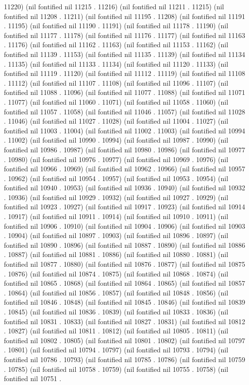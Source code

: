 11220) (nil fontified nil 11215 . 11216) (nil fontified nil 11211 . 11215) (nil fontified nil 11208 . 11211) (nil fontified nil 11195 . 11208) (nil fontified nil 11191 . 11195) (nil fontified nil 11190 . 11191) (nil fontified nil 11178 . 11190) (nil fontified nil 11177 . 11178) (nil fontified nil 11176 . 11177) (nil fontified nil 11163 . 11176) (nil fontified nil 11162 . 11163) (nil fontified nil 11153 . 11162) (nil fontified nil 11139 . 11153) (nil fontified nil 11135 . 11139) (nil fontified nil 11134 . 11135) (nil fontified nil 11133 . 11134) (nil fontified nil 11120 . 11133) (nil fontified nil 11119 . 11120) (nil fontified nil 11112 . 11119) (nil fontified nil 11108 . 11112) (nil fontified nil 11107 . 11108) (nil fontified nil 11096 . 11107) (nil fontified nil 11088 . 11096) (nil fontified nil 11077 . 11088) (nil fontified nil 11071 . 11077) (nil fontified nil 11060 . 11071) (nil fontified nil 11058 . 11060) (nil fontified nil 11057 . 11058) (nil fontified nil 11046 . 11057) (nil fontified nil 11028 . 11046) (nil fontified nil 11027 . 11028) (nil fontified nil 11004 . 11027) (nil fontified nil 11003 . 11004) (nil fontified nil 11002 . 11003) (nil fontified nil 10994 . 11002) (nil fontified nil 10990 . 10994) (nil fontified nil 10987 . 10990) (nil fontified nil 10986 . 10987) (nil fontified nil 10980 . 10986) (nil fontified nil 10977 . 10980) (nil fontified nil 10976 . 10977) (nil fontified nil 10969 . 10976) (nil fontified nil 10966 . 10969) (nil fontified nil 10962 . 10966) (nil fontified nil 10957 . 10962) (nil fontified nil 10954 . 10957) (nil fontified nil 10953 . 10954) (nil fontified nil 10940 . 10953) (nil fontified nil 10936 . 10940) (nil fontified nil 10932 . 10936) (nil fontified nil 10929 . 10932) (nil fontified nil 10927 . 10929) (nil fontified nil 10923 . 10927) (nil fontified nil 10917 . 10923) (nil fontified nil 10914 . 10917) (nil fontified nil 10911 . 10914) (nil fontified nil 10910 . 10911) (nil fontified nil 10906 . 10910) (nil fontified nil 10904 . 10906) (nil fontified nil 10903 . 10904) (nil fontified nil 10897 . 10903) (nil fontified nil 10896 . 10897) (nil fontified nil 10890 . 10896) (nil fontified nil 10887 . 10890) (nil fontified nil 10886 . 10887) (nil fontified nil 10881 . 10886) (nil fontified nil 10880 . 10881) (nil fontified nil 10877 . 10880) (nil fontified nil 10876 . 10877) (nil fontified nil 10875 . 10876) (nil fontified nil 10874 . 10875) (nil fontified nil 10868 . 10874) (nil fontified nil 10865 . 10868) (nil fontified nil 10864 . 10865) (nil fontified nil 10857 . 10864) (nil fontified nil 10856 . 10857) (nil fontified nil 10848 . 10856) (nil fontified nil 10846 . 10848) (nil fontified nil 10845 . 10846) (nil fontified nil 10839 . 10845) (nil fontified nil 10836 . 10839) (nil fontified nil 10833 . 10836) (nil fontified nil 10831 . 10833) (nil fontified nil 10827 . 10831) (nil fontified nil 10812 . 10827) (nil fontified nil 10811 . 10812) (nil fontified nil 10805 . 10811) (nil fontified nil 10802 . 10805) (nil fontified nil 10801 . 10802) (nil fontified nil 10797 . 10801) (nil fontified nil 10794 . 10797) (nil fontified nil 10793 . 10794) (nil fontified nil 10786 . 10793) (nil fontified nil 10785 . 10786) (nil fontified nil 10759 . 10785) (nil fontified nil 10758 . 10759) (nil fontified nil 10755 . 10758) (nil fontified nil 10751 . 
